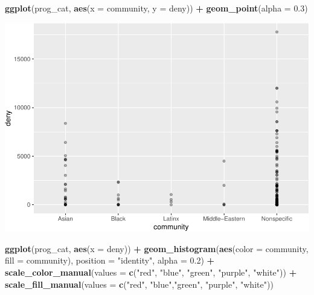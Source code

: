 \documentclass[]{article}
\newenvironment{Shaded}{\begin{snugshade}}{\end{snugshade}}
\newcommand{\DataTypeTok}[1]{\textcolor[rgb]{0.13,0.29,0.53}{#1}}
\newcommand{\FloatTok}[1]{\textcolor[rgb]{0.00,0.00,0.81}{#1}}
\newcommand{\KeywordTok}[1]{\textcolor[rgb]{0.13,0.29,0.53}{\textbf{#1}}}
\newcommand{\NormalTok}[1]{#1}
\newcommand{\OperatorTok}[1]{\textcolor[rgb]{0.81,0.36,0.00}{\textbf{#1}}}
\newcommand{\StringTok}[1]{\textcolor[rgb]{0.31,0.60,0.02}{#1}}
\begin{document}
\begin{Shaded}
\begin{Highlighting}[]
\KeywordTok{ggplot}\NormalTok{(prog_cat, }\KeywordTok{aes}\NormalTok{(}\DataTypeTok{x =}\NormalTok{ community, }\DataTypeTok{y =}\NormalTok{ deny)) }\OperatorTok{+}
\StringTok{  }\KeywordTok{geom_point}\NormalTok{(}\DataTypeTok{alpha =} \FloatTok{0.3}\NormalTok{)}
\end{Highlighting}
\end{Shaded}

\includegraphics{sofc-funding_files/figure-latex/unnamed-chunk-7-2.pdf}

\begin{Shaded}
\begin{Highlighting}[]
\KeywordTok{ggplot}\NormalTok{(prog_cat, }\KeywordTok{aes}\NormalTok{(}\DataTypeTok{x =}\NormalTok{ deny)) }\OperatorTok{+}
\StringTok{  }\KeywordTok{geom_histogram}\NormalTok{(}\KeywordTok{aes}\NormalTok{(}\DataTypeTok{color =}\NormalTok{ community, }\DataTypeTok{fill =}\NormalTok{ community),}
                 \DataTypeTok{position =} \StringTok{"identity"}\NormalTok{, }\DataTypeTok{alpha =} \FloatTok{0.2}\NormalTok{) }\OperatorTok{+}
\StringTok{  }\KeywordTok{scale_color_manual}\NormalTok{(}\DataTypeTok{values =} \KeywordTok{c}\NormalTok{(}\StringTok{"red"}\NormalTok{, }\StringTok{"blue"}\NormalTok{, }\StringTok{"green"}\NormalTok{, }\StringTok{"purple"}\NormalTok{, }\StringTok{"white"}\NormalTok{)) }\OperatorTok{+}
\StringTok{  }\KeywordTok{scale_fill_manual}\NormalTok{(}\DataTypeTok{values =} \KeywordTok{c}\NormalTok{(}\StringTok{"red"}\NormalTok{, }\StringTok{"blue"}\NormalTok{,}\StringTok{"green"}\NormalTok{, }\StringTok{"purple"}\NormalTok{, }\StringTok{"white"}\NormalTok{))}
\end{Highlighting}
\end{Shaded}
\end{document}

